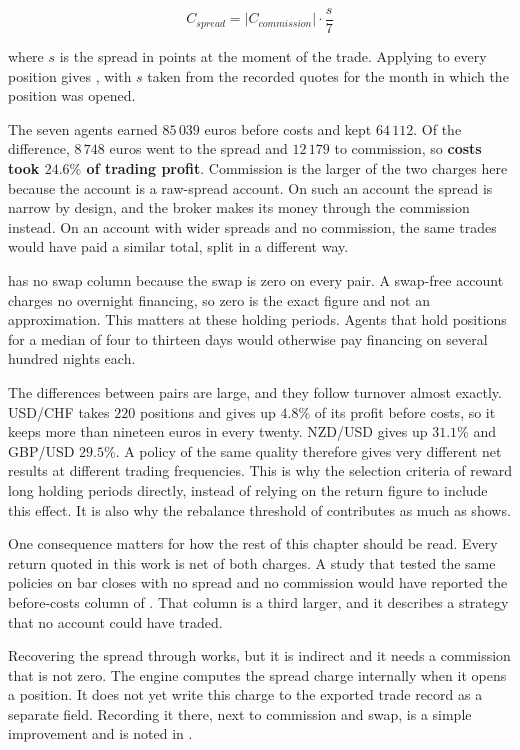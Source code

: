 \begin{equation}
C_{spread} = \left| C_{commission} \right| \cdot \frac{s}{7}
\label{Equation:SpreadRecovery}
\end{equation}

where $s$ is the spread in points at the moment of the trade. Applying  to every position gives , with $s$ taken from the recorded quotes for the month in which the position was opened.



The seven agents earned $85\,039$ euros before costs and kept $64\,112$. Of the difference, $8\,748$ euros went to the spread and $12\,179$ to commission, so \textbf{costs took $24.6\%$ of trading profit}. Commission is the larger of the two charges here because the account is a raw-spread account. On such an account the spread is narrow by design, and the broker makes its money through the commission instead. On an account with wider spreads and no commission, the same trades would have paid a similar total, split in a different way.

 has no swap column because the swap is zero on every pair. A swap-free account charges no overnight financing, so zero is the exact figure and not an approximation. This matters at these holding periods. Agents that hold positions for a median of four to thirteen days would otherwise pay financing on several hundred nights each.

The differences between pairs are large, and they follow turnover almost exactly. USD/CHF takes $220$ positions and gives up $4.8\%$ of its profit before costs, so it keeps more than nineteen euros in every twenty. NZD/USD gives up $31.1\%$ and GBP/USD $29.5\%$. A policy of the same quality therefore gives very different net results at different trading frequencies. This is why the selection criteria of  reward long holding periods directly, instead of relying on the return figure to include this effect. It is also why the rebalance threshold of  contributes as much as  shows.

One consequence matters for how the rest of this chapter should be read. Every return quoted in this work is net of both charges. A study that tested the same policies on bar closes with no spread and no commission would have reported the before-costs column of . That column is a third larger, and it describes a strategy that no account could have traded.

Recovering the spread through  works, but it is indirect and it needs a commission that is not zero. The engine computes the spread charge internally when it opens a position. It does not yet write this charge to the exported trade record as a separate field. Recording it there, next to commission and swap, is a simple improvement and is noted in .